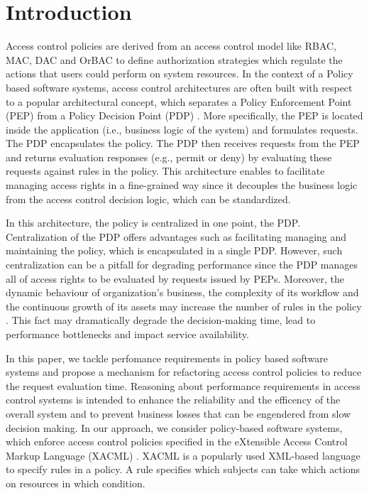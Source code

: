 
\section{Introduction} \label{sec:introduction}

Access control policies are derived from an access control model like RBAC, MAC, DAC and OrBAC \cite{dac,mac,rbac,orbac} to define authorization strategies which regulate the actions 
that users could perform on system resources. In the context of a Policy based software systems, access control architectures are often built with respect to a popular architectural 
concept, which separates a Policy Enforcement Point (PEP) from a Policy Decision Point (PDP) \cite{separation}. More specifically, the PEP is located inside the application (i.e., business logic of the system) and formulates 
requests.
The PDP encapsulates the policy. The PDP then receives requests from the PEP and returns evaluation responses (e.g., permit or deny) by evaluating these requests 
against rules in the policy. This architecture enables to facilitate managing access rights in a fine-grained way since it 
decouples the business logic from the access control decision logic, which can be standardized. 

In this architecture, the policy is centralized in one point, the PDP. Centralization of the PDP offers advantages such as facilitating managing and maintaining the policy, 
which is encapsulated in a single PDP. However, such centralization can be a pitfall for degrading performance since the PDP manages all of access rights to be evaluated by 
requests issued by PEPs. Moreover, the dynamic behaviour of organization's business, the complexity of its workflow and the continuous growth of its assets may increase the 
number of rules in the policy \cite{policymanagement}. This fact may dramatically degrade the decision-making time, lead to performance bottlenecks and impact service availability.

In this paper, we tackle perfomance requirements in policy based software systems and propose a mechanism for refactoring access control policies to reduce
the request evaluation time. Reasoning about performance requirements in access control systems is intended to enhance the reliability and the efficency of the overall system 
and to prevent business losses that can be engendered from slow decision making. In our approach, we consider policy-based software systems, which
enforce access control policies specified in the eXtensible Access Control Markup Language (XACML) \cite{sunxacml}. XACML is a popularly used XML-based language to specify rules 
in a policy. A rule specifies which subjects can take which actions on resources in which condition.

